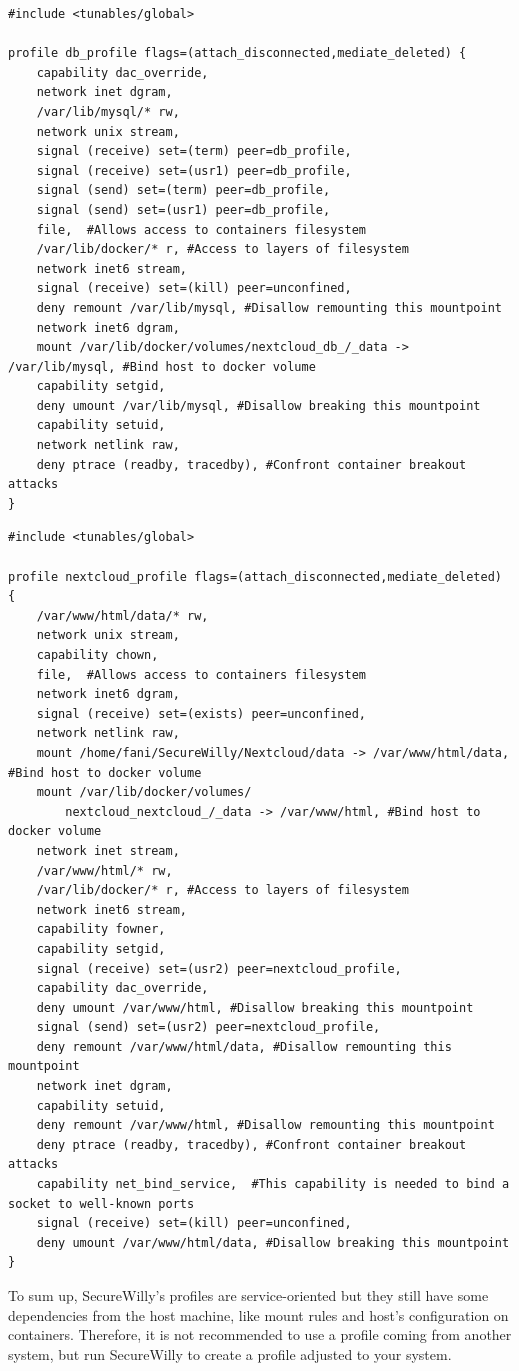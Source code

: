 \begin{lstlisting}[style=Dockerfile, caption={New AppArmor profile for db service: db\_profile}]
#include <tunables/global>

profile db_profile flags=(attach_disconnected,mediate_deleted) {
	capability dac_override,
	network inet dgram,
	/var/lib/mysql/* rw,
	network unix stream,
	signal (receive) set=(term) peer=db_profile,
	signal (receive) set=(usr1) peer=db_profile,
	signal (send) set=(term) peer=db_profile,
	signal (send) set=(usr1) peer=db_profile,
	file,  #Allows access to containers filesystem
	/var/lib/docker/* r, #Access to layers of filesystem
	network inet6 stream,
	signal (receive) set=(kill) peer=unconfined,
	deny remount /var/lib/mysql, #Disallow remounting this mountpoint
	network inet6 dgram,
	mount /var/lib/docker/volumes/nextcloud_db_/_data -> /var/lib/mysql, #Bind host to docker volume
	capability setgid,
	deny umount /var/lib/mysql, #Disallow breaking this mountpoint
	capability setuid,
	network netlink raw,
	deny ptrace (readby, tracedby), #Confront container breakout attacks
}
\end{lstlisting}
\clearpage
\begin{lstlisting}[style=Dockerfile, caption={New AppArmor profile for nextcloud service: nextcloud\_profile}]
#include <tunables/global>

profile nextcloud_profile flags=(attach_disconnected,mediate_deleted) {
	/var/www/html/data/* rw,
	network unix stream,
	capability chown,
	file,  #Allows access to containers filesystem
	network inet6 dgram,
	signal (receive) set=(exists) peer=unconfined,
	network netlink raw,
	mount /home/fani/SecureWilly/Nextcloud/data -> /var/www/html/data, #Bind host to docker volume
	mount /var/lib/docker/volumes/
		nextcloud_nextcloud_/_data -> /var/www/html, #Bind host to docker volume
	network inet stream,
	/var/www/html/* rw,
	/var/lib/docker/* r, #Access to layers of filesystem
	network inet6 stream,
	capability fowner,
	capability setgid,
	signal (receive) set=(usr2) peer=nextcloud_profile,
	capability dac_override,
	deny umount /var/www/html, #Disallow breaking this mountpoint
	signal (send) set=(usr2) peer=nextcloud_profile,
	deny remount /var/www/html/data, #Disallow remounting this mountpoint
	network inet dgram,
	capability setuid,
	deny remount /var/www/html, #Disallow remounting this mountpoint
	deny ptrace (readby, tracedby), #Confront container breakout attacks
	capability net_bind_service,  #This capability is needed to bind a socket to well-known ports
	signal (receive) set=(kill) peer=unconfined,
	deny umount /var/www/html/data, #Disallow breaking this mountpoint
}
\end{lstlisting}
\begin{mdframed}[backgroundcolor=navajowhite]
To sum up, SecureWilly's profiles are service-oriented but they still have some dependencies from the host machine, like mount rules and host's configuration on containers. Therefore, it is not recommended to use a profile coming from another system, but run SecureWilly to create a profile adjusted to your system.
\end{mdframed}


